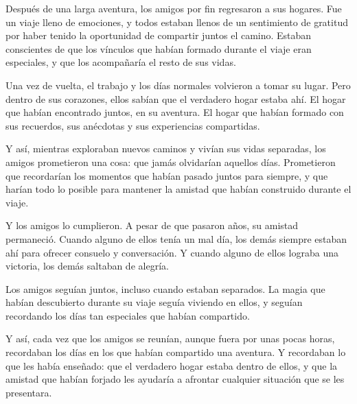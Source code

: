 

Después de una larga aventura, los amigos por fin regresaron a sus hogares. Fue un viaje lleno de emociones, y todos estaban llenos de un sentimiento de gratitud por haber tenido la oportunidad de compartir juntos el camino. Estaban conscientes de que los vínculos que habían formado durante el viaje eran especiales, y que los acompañaría el resto de sus vidas.

Una vez de vuelta, el trabajo y los días normales volvieron a tomar su lugar. Pero dentro de sus corazones, ellos sabían que el verdadero hogar estaba ahí. El hogar que habían encontrado juntos, en su aventura. El hogar que habían formado con sus recuerdos, sus anécdotas y sus experiencias compartidas.

Y así, mientras exploraban nuevos caminos y vivían sus vidas separadas, los amigos prometieron una cosa: que jamás olvidarían aquellos días. Prometieron que recordarían los momentos que habían pasado juntos para siempre, y que harían todo lo posible para mantener la amistad que habían construido durante el viaje.

Y los amigos lo cumplieron. A pesar de que pasaron años, su amistad permaneció. Cuando alguno de ellos tenía un mal día, los demás siempre estaban ahí para ofrecer consuelo y conversación. Y cuando alguno de ellos lograba una victoria, los demás saltaban de alegría.

Los amigos seguían juntos, incluso cuando estaban separados. La magia que habían descubierto durante su viaje seguía viviendo en ellos, y seguían recordando los días tan especiales que habían compartido.

Y así, cada vez que los amigos se reunían, aunque fuera por unas pocas horas, recordaban los días en los que habían compartido una aventura. Y recordaban lo que les había enseñado: que el verdadero hogar estaba dentro de ellos, y que la amistad que habían forjado les ayudaría a afrontar cualquier situación que se les presentara.